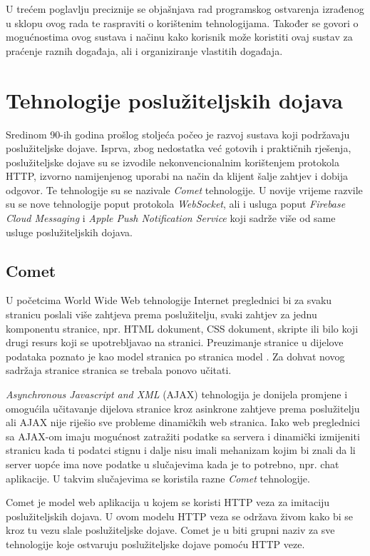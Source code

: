\documentclass[times, utf8, zavrsni]{fer}
\begin{document}
U trećem poglavlju preciznije se objašnjava rad programskog ostvarenja izrađenog u sklopu ovog rada te raspraviti o korištenim tehnologijama. Također se govori o mogućnostima ovog sustava i načinu kako korisnik može koristiti ovaj sustav za praćenje raznih događaja, ali i organiziranje vlastitih događaja.

\chapter{Tehnologije poslužiteljskih dojava}
\label{chp:technologies}

Sredinom 90-ih godina prošlog stoljeća počeo je razvoj sustava koji podržavaju poslužiteljske dojave. Isprva, zbog nedostatka već gotovih i praktičnih rješenja, poslužiteljske dojave su se izvodile nekonvencionalnim korištenjem protokola HTTP, izvorno namijenjenog uporabi na način da klijent šalje zahtjev i dobija odgovor. Te tehnologije su se nazivale {\em Comet} tehnologije. U novije vrijeme razvile su se nove tehnologije poput protokola {\em WebSocket}, ali i usluga poput {\em Firebase Cloud Messaging} i {\em Apple Push Notification Service} koji sadrže više od same usluge poslužiteljskih dojava.

\section{Comet}
U početcima World Wide Web tehnologije Internet preglednici bi za svaku stranicu poslali više zahtjeva prema poslužitelju, svaki zahtjev za jednu komponentu stranice, npr. HTML dokument, CSS dokument, skripte ili bilo koji drugi resurs koji se upotrebljavao na stranici. Preuzimanje stranice u dijelove podataka poznato je kao model stranica po stranica model . Za dohvat novog sadržaja stranice stranica se trebala ponovo učitati.

{\em Asynchronous Javascript and XML} (AJAX) tehnologija je donijela promjene i omogućila učitavanje dijelova stranice kroz asinkrone zahtjeve prema poslužitelju ali AJAX nije riješio sve probleme dinamičkih web stranica. Iako web preglednici sa AJAX-om imaju mogućnost zatražiti podatke sa servera i dinamički izmijeniti stranicu kada ti podatci stignu i dalje nisu imali mehanizam kojim bi znali da li server uopće ima nove podatke u slučajevima kada je to potrebno, npr. chat aplikacije. U takvim slučajevima se koristila razne {\em Comet} tehnologije.\citep{gravelle2009comet}

Comet je model web aplikacija u kojem se koristi HTTP veza za imitaciju poslužiteljskih dojava. U ovom modelu HTTP veza se održava živom kako bi se kroz tu vezu slale poslužiteljske dojave. Comet je u biti grupni naziv za sve tehnologije koje ostvaruju poslužiteljske dojave pomoću HTTP veze.
\end{document}
